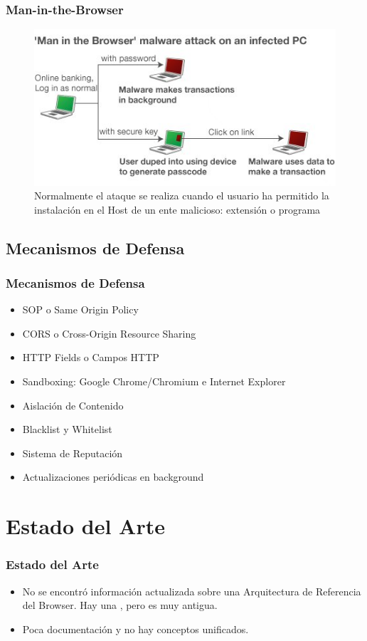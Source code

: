 \documentclass[serif,9pt]{beamer}
\begin{document}
\begin{frame}
	\frametitle{Man-in-the-Browser}
	\begin{figure}[h]
        \centering
        \includegraphics[scale=0.7]{figures/_58291188_malware_464v2.jpg}
        \caption{Normalmente el ataque se realiza cuando el usuario ha permitido la instalaci\'on en el Host de un ente malicioso: extensi\'on o programa}
        \label{fig:vulnExt}
    \end{figure}
\end{frame}

\subsection{Mecanismos de Defensa}
\begin{frame}
	\frametitle{Mecanismos de Defensa}
	\begin{itemize}
		\item<1-> SOP o Same Origin Policy
		\item<2-> CORS o Cross-Origin Resource Sharing
		\item<3-> HTTP Fields o Campos HTTP
		\item<4-> Sandboxing: Google Chrome/Chromium e Internet Explorer
		\item<5-> Aislaci\'on de Contenido
		\item<6-> Blacklist y Whitelist
		\item<7-> Sistema de Reputaci\'on
		\item<8-> Actualizaciones peri\'odicas en background
	\end{itemize}
\end{frame}


\section{Estado del Arte}
\begin{frame}
	\frametitle{Estado del Arte}
	\begin{itemize}
		\item<1-> No se encontr\'o informaci\'on actualizada sobre una Arquitectura de Referencia del Browser. Hay una \cite{preprint-grosskurth-browser-archevol}, pero es muy antigua.
		\item<2-> Poca documentaci\'on y no hay conceptos unificados.
	\end{itemize}
\end{frame}
\end{document}
